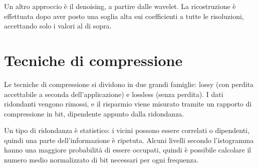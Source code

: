 Un altro approccio è il denoising, a partire dalle wavelet. La ricostruzione è effettuata dopo aver posto una soglia alta sui coefficienti a tutte le risoluzioni, accettando solo i valori al di sopra. 

\section{Tecniche di compressione}
Le tecniche di compressione si dividono in due grandi famiglie: lossy (con perdita accettabile a seconda dell'applicazione) e lossless (senza perdita). I dati ridondanti vengono rimossi, e il risparmio viene misurato tramite un rapporto di compressione in bit, dipendente appunto dalla ridondanza. 

Un tipo di ridondanza è statistico: i vicini possono essere correlati o dipendenti, quindi una parte dell'informazione è ripetuta. Alcuni livelli secondo l'istogramma hanno una maggiore probabilità di essere occupati, quindi è possibile calcolare il numero medio normalizzato di bit necessari per ogni frequenza. 
